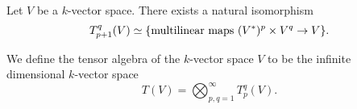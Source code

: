 \begin{lemma}\label{lem:iso-tensor-alg-multilinear-maps}
    Let \(V\) be a \(k\)-vector space. There exists a natural isomorphism
    \[
        T_{p + 1}^q(V) \simeq \{\text{multilinear maps } (V^*)^p \times V^q \to V\}.
    \]
\end{lemma}

\begin{definition}\label{def: tensor algebra vs}
    We define the tensor algebra of the \(k\)-vector space \(V\) to be the
    infinite dimensional \(k\)-vector space
    \[
        T(V) = \bigotimes_{p, q = 1}^\infty T_p^q(V).
    \]
\end{definition}

